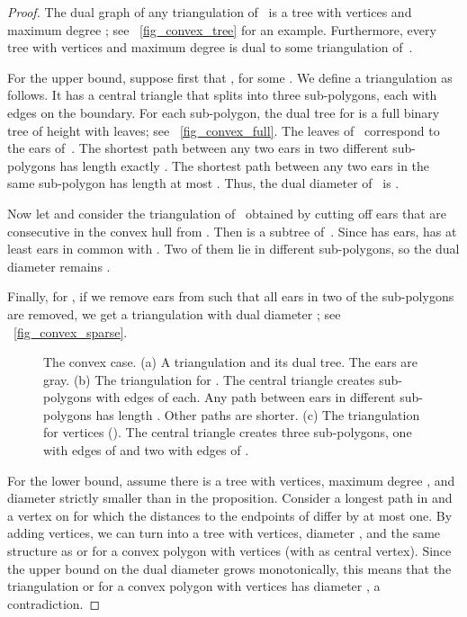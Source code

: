 \documentclass{article}
\begin{document}
\begin{proof} 
The dual graph of any triangulation of~ is a tree with  
vertices and maximum degree ; see \figurename~\ref{fig_convex_tree} for 
an example.
Furthermore, every tree with  vertices and maximum degree  
is dual to some triangulation of~.

For the upper bound, suppose first that , for some 
. We define a triangulation  as follows.
It has a central triangle that splits  into three 
sub-polygons, each with  edges on the boundary. 
For each sub-polygon, the dual tree for  
is a full binary tree of height 
 with  leaves; see 
\figurename~\ref{fig_convex_full}.
The leaves of~ correspond to the ears of~.
The shortest path between any two ears in two different 
sub-polygons has length exactly
. The shortest path between any two ears in 
the same sub-polygon has length at most .
Thus, the dual diameter of~ is .

Now let  and consider the triangulation  of~ 
obtained by cutting off  
ears that are consecutive in the convex hull from . Then  is a subtree
of~. Since  has  
ears,  has at least  ears in common with .
Two of them lie in different sub-polygons, so the dual diameter remains 
.

Finally, for 
, 
if we remove   ears from 
such that all ears in two of the sub-polygons are removed, we get
a triangulation with dual 
diameter ; see 
\figurename~\ref{fig_convex_sparse}.
	
\begin{figure}[htb]
\centering
{} \hspace{0.3cm}
 \hspace{0.3cm}
\caption{The convex case. 
	(a) A triangulation and its dual tree. The ears 
	are gray. 
	(b) 
	The triangulation  for 
	. The 
	central triangle creates sub-polygons with  edges of  each.
	Any path between ears in different sub-polygons has length .
	Other paths are shorter.
	(c) 
	The triangulation  for  vertices 
	(). The central 
	triangle creates three sub-polygons, one with
	 edges of  and two with   edges of .
}
\label{fig_convex}
\end{figure}

For the lower bound, assume there is a tree  with 
 vertices, maximum degree , and diameter  strictly smaller 
than in the proposition. 
Consider a longest path  in  and a vertex  on 
 for which 
the distances to the endpoints of  differ by at most one. 
By adding vertices, we can turn   into a tree with 
 vertices, diameter , and the same structure as 
 or  for a convex polygon with 
vertices
(with  as central vertex).  
Since the upper 
bound on the dual diameter grows monotonically, this means that
the triangulation  or  for a convex polygon with 
vertices has diameter , a contradiction.
\end{proof}
\end{document}
